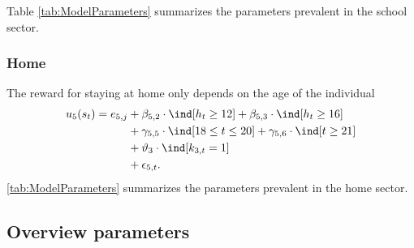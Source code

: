Table \ref{tab:ModelParameters} summarizes the parameters prevalent in the school sector.


\FloatBarrier\subsubsection{Home}
The reward for staying at home only depends on the age of the individual
%
\begin{align}
    u_5(s_t) =  e_{5,j} & + \beta_{5,2} \cdot \ind[h_t \geq 12] + \beta_{5,3} \cdot \ind[h_t \geq 16] 			 \nonumber \\
    							   & + \gamma_{5,5} \cdot \ind[18 \leq t \leq 20] + \gamma_{5,6} \cdot \ind[t \geq 21] \nonumber \\
    							   & + \vartheta_3 \cdot \ind[k_{3,t} = 1]  \nonumber \\
    							   & + \epsilon_{5,t}.
\end{align}
%
\autoref{tab:ModelParameters} summarizes the parameters prevalent in the home sector.

\clearpage 

\FloatBarrier\subsection{Overview parameters}



\clearpage
